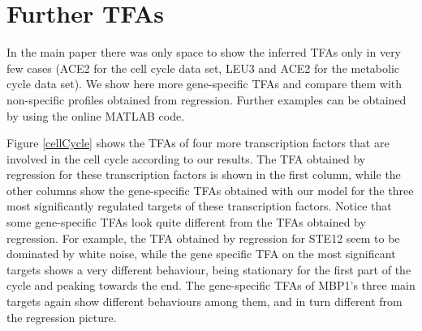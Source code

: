 \documentclass[english]{sheftech}
\begin{document}
\section{Further TFAs}
In the main paper there was only space to show the inferred TFAs only in very few cases (ACE2 
for the cell cycle data set, LEU3 and ACE2 for the metabolic cycle data set). 
We show here more gene-specific TFAs and compare them with non-specific 
profiles obtained from regression. Further examples can be obtained by using
the online MATLAB code.

Figure \ref{cellCycle} shows the TFAs of four more transcription factors that
are involved in the cell cycle according to our results. The TFA obtained by regression for these transcription factors is 
shown in the first column, while the other columns show the gene-specific
TFAs obtained with our model for the three most significantly regulated
targets of these transcription factors. Notice that some gene-specific TFAs 
look quite different from the TFAs obtained by regression. For example, the TFA
obtained by regression for STE12 seem to be dominated by white noise, while the
gene specific TFA on the most significant targets shows a very different 
behaviour, being stationary for the first part of the cycle and peaking 
towards the end. The gene-specific TFAs of MBP1's three main targets again 
show different behaviours among them, and in turn different from the regression
picture. 
\end{document}
